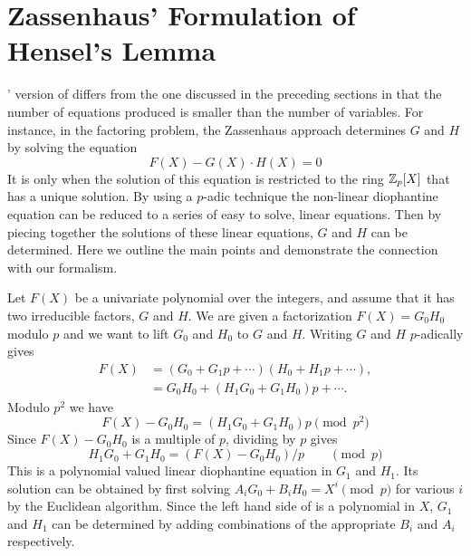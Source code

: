 {\section{Zassenhaus' Formulation of Hensel's Lemma}
\label{Zassenhaus:Formulation:Sec}

{\Zassenhaus}' version of  differs from the one
discussed in the preceding sections in that the number of equations
produced is smaller than the number of variables.  For instance, in
the factoring problem, the Zassenhaus approach determines $G$ and $H$
by solving the equation
\begin{equation}
 \label{Zassen:Factor:Eq}
F(X) - G(X) \cdot H(X) = 0
\end{equation}
It is only when the solution of this equation is restricted to the ring
$\mathbb{Z}_{p}[X]$ that  has a unique solution.  By using
a $p$-adic technique the non-linear diophantine equation
 can be reduced to a series of easy to solve,
linear equations.  Then by piecing together the solutions of these linear
equations, $G$ and $H$ can be determined.  Here we outline the main 
points and demonstrate the connection with our formalism.

Let $F(X)$ be a univariate polynomial over the integers, and assume
that it has two irreducible factors, $G$ and $H$.  We are given a
factorization $F(X) = G_0 H_0$ modulo $p$ and we want to lift $G_0$
and $H_0$ to $G$ and $H$.  Writing $G$ and $H$ $p$-adically gives
\[
\begin{aligned}
  F(X) &= (G_0 + G_1 p + \cdots) (H_0 + H_1 p + \cdots), \\
   &= G_0 H_0 + (H_1 G_0 + G_1 H_0) p + \cdots.
\end{aligned}
\]
Modulo $p^2$ we have
\[
F(X) - G_0 H_0 = (H_1 G_0 + G_1 H_0) p \pmod{p^2}
\]
Since $F(X) - G_0 H_0$ is a multiple of $p$, dividing by $p$ gives 
\begin{equation}
H_1 G_0 + G_1 H_0 = \left( F(X) - G_0 H_0 \right) / p \qquad\pmod{p}
\label{Linear:Dio:Eq}
\end{equation}
This is a polynomial valued linear diophantine equation in $G_1$ and $H_1$.  Its solution can be obtained by 
first solving $A_i G_0 + B_i H_0 = X^i \pmod{p}$ for various $i$ by the 
Euclidean algorithm.  Since the left hand side of  
is a polynomial in $X$, $G_1$ and $H_1$ can be determined by adding 
combinations of the appropriate $B_i$ and $A_i$ respectively.

}
